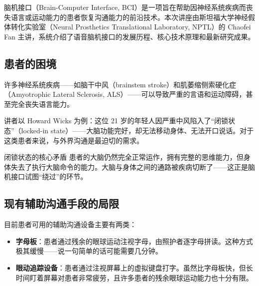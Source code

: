 \documentclass[a4paper]{article}
\begin{document}
脑机接口（Brain-Computer Interface, BCI）是一项旨在帮助因神经系统疾病而丧失语言或运动能力的患者恢复沟通能力的前沿技术。本次讲座由斯坦福大学神经假体转化实验室（Neural Prosthetics Translational Laboratory, NPTL）的 Chaofei Fan 主讲，系统介绍了语音脑机接口的发展历程、核心技术原理和最新研究成果。




\subsection{患者的困境}

许多神经系统疾病——如脑干中风（brainstem stroke）和肌萎缩侧索硬化症（Amyotrophic Lateral Sclerosis, ALS）——可以导致严重的言语和运动障碍，甚至完全丧失语言能力。





讲者以 Howard Wicks 为例：这位 21 岁的年轻人因严重中风陷入了``闭锁状态''（locked-in state）——大脑功能完好，却无法移动身体、无法开口说话。对于这类患者来说，与外界沟通是最迫切的需求。

\begin{importantbox}{闭锁状态的核心矛盾}
患者的大脑仍然完全正常运作，拥有完整的思维能力，但身体失去了执行大脑命令的能力。大脑与身体之间的通路被疾病切断了——这正是脑机接口试图``绕过''的环节。
\end{importantbox}

\subsection{现有辅助沟通手段的局限}

目前患者可用的辅助沟通设备主要有两类：





\begin{itemize}
    \item \textbf{字母板}：患者通过残余的眼球运动注视字母，由照护者逐字母拼读。这种方式极其缓慢——说一句简单的话可能需要几分钟。
    \item \textbf{眼动追踪设备}：患者通过注视屏幕上的虚拟键盘打字。虽然比字母板快，但长时间盯着屏幕对患者非常疲劳，且许多患者的残余眼球运动能力也十分有限。
\end{itemize}
\end{document}
